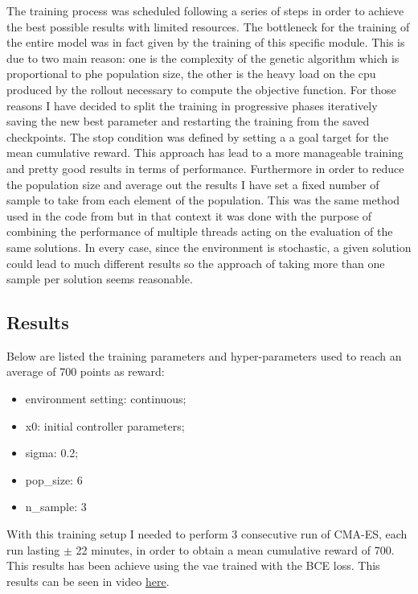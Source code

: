 \documentclass[10pt,a4paper]{article}
\begin{document}
The training process was scheduled following a series of steps in order to achieve the best possible results with limited resources. The bottleneck for the training of the entire model was in fact given by the training of this specific module. This is due to two main reason: one is the complexity of the genetic algorithm which is proportional to phe population size, the other is the heavy load on the cpu produced by the rollout necessary to compute the objective function. For those reasons I have decided to split the training in progressive phases iteratively saving the new best parameter and restarting the training from the saved checkpoints. The stop condition was defined by setting a a goal target for the mean cumulative reward. This approach has lead to a more manageable training and pretty good results in terms of performance. Furthermore in order to reduce the population size and average out the results I have set a fixed number of sample to take from each element of the population. This was the same method used in the code from \cite{ctallec-wm} but in that context it was done with the purpose of combining the performance of multiple threads acting on the evaluation of the same solutions. In every case, since the environment is stochastic, a given solution could lead to much different results so the approach of taking more than one sample per solution seems reasonable.\

\subsection{Results}
Below are listed the  training parameters and hyper-parameters used to reach an average of 700 points as reward:
\begin{itemize}
    \item environment setting: continuous;
    \item x0: initial controller parameters;
    \item sigma: 0.2;
    \item pop\_size: 6
    \item n\_sample: 3
\end{itemize}
With this training setup I needed to perform 3 consecutive run of CMA-ES, each run lasting $\pm$ 22 minutes, in order to obtain a mean cumulative reward of 700. This results has been achieve using the vae trained with the BCE loss. This results can be seen in video \href{https://drive.google.com/drive/folders/1k__Mbe3cCUXCfmbZ8MfM8Zqmpdaix_Ql}{\underline{here}}.

\newpage


\printbibliography

\end{document}
